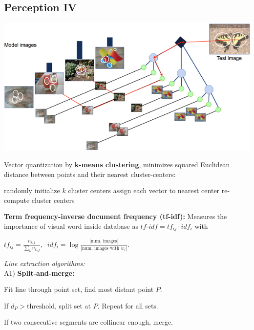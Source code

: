 \documentclass[landscape]{article}
\newcommand{\vmspace}{\vspace{-7pt}}
\newcommand{\vamspace}{\vspace{-3pt}}
\newcommand{\vpspace}{\vspace{5pt}}
\begin{document}
\begin{multicols}{3}
\section{Perception IV}

\vmspace

\vspace{-5pt}
\begin{center}
\includegraphics[width=0.85\columnwidth]{img/7_VocabularyTree.png}
\end{center}
\vspace{-10pt}

\begin{minipage}{\columnwidth}
  Vector quantization by \textbf{k-means clustering}, minimizes squared
  Euclidean distance between points and their nearest cluster-centers:

  \vamspace

  \begin{algorithm}[H]
    \DontPrintSemicolon
    randomly initialize $k$ cluster centers\;
    {
      assign each vector to nearest center\;
      re-compute cluster centers\;
    }
  \end{algorithm}
\end{minipage}

\vpspace

\begin{minipage}{\columnwidth}
  \textbf{Term frequency-inverse document frequency (tf-idf):} Measures the
  importance of visual word inside database as $tf\text{-}idf = tf_{ij}\cdot
  idf_i$ with
  \begin{center}
    $
    tf_{ij} = \frac{n_{i,j}}{\sum_k n_{k,j}},\;\;
    idf_i = \log\frac{|\text{num. images}|}{|\text{num. images with } w_i|}.
    $
  \end{center}
\end{minipage}

\vpspace

\begin{minipage}{\columnwidth}
  \textit{Line extraction algorithms:}\\
  A1) \textbf{Split-and-merge:}
  \begin{compactenum}
  \item Fit line through point set, find most distant point $P$.
  \item If $d_P > \mathrm{threshold}$, split set at $P$. Repeat for all sets.
  \item If two consecutive segments are collinear enough, merge.
  \end{compactenum}
\end{minipage}


\end{multicols}
\end{document}
